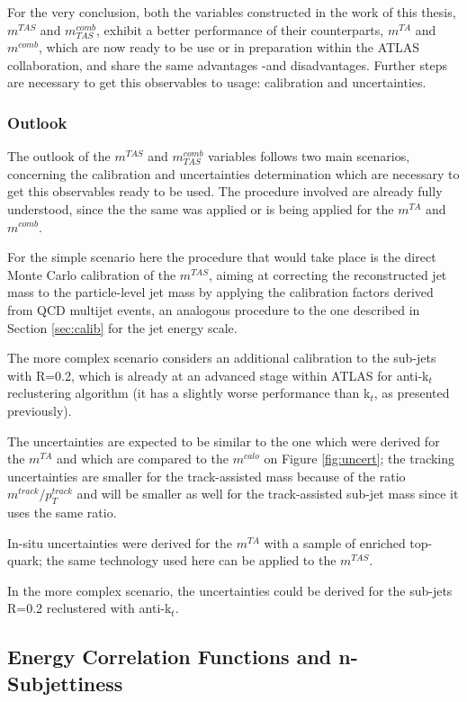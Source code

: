 \documentclass[UKenglish,texlive=2013]{\ATLASLATEXPATH atlasdoc}
\newcommand{\mta}{m^{TA}}
\newcommand{\mtas}{m^{TAS}}
\newcommand{\mcal}{m^{calo}}
\newcommand{\mcomb}{m^{comb}}
\newcommand{\mcombtas}{m^{comb}_{TAS}}
\begin{document}
For the very conclusion, both the variables constructed in the work of this thesis,$\mtas$ and $\mcombtas$, exhibit a better performance of their counterparts, $\mta$ and $\mcomb$, which are now ready to be use or in preparation within the ATLAS collaboration, and share the same advantages -and disadvantages. Further steps are necessary to get this observables to usage: calibration and uncertainties.

\subsubsection{Outlook}
The outlook of the $\mtas$ and $\mcombtas$ variables follows two main scenarios, concerning the calibration and uncertainties determination which are necessary to get this observables ready to be used. The procedure involved are already fully understood, since the the same was applied or is being applied for the $\mta$ and $\mcomb$.

For the simple scenario here the procedure that would take place is the direct Monte Carlo calibration of the $\mtas$, aiming at correcting the reconstructed jet mass to the particle-level jet mass by applying the calibration factors derived from QCD multijet events, an analogous procedure to the one described in Section \ref{sec:calib} for the jet energy scale.

The more complex scenario considers an additional calibration to the sub-jets with R=0.2, which is already at an advanced stage within ATLAS for anti-k$_t$ reclustering algorithm (it has a slightly worse performance than k$_t$, as presented previously). 

The uncertainties are expected to be similar to the one which were derived for the $\mta$ and which are compared to the $\mcal$ on Figure \ref{fig:uncert}; the tracking uncertainties are smaller for the track-assisted mass because of the ratio $m^{track}/p_T^{track}$ and will be smaller as well for the track-assisted  sub-jet mass since it uses the same ratio.

In-situ uncertainties were derived for the $\mta$ with a sample of enriched top-quark; the same technology used here can be applied to the $\mtas$.

In the more complex scenario, the uncertainties could be derived for the sub-jets R=0.2 reclustered with anti-k$_{t}$.
\subsection{Energy Correlation Functions and n-Subjettiness}
\end{document}
